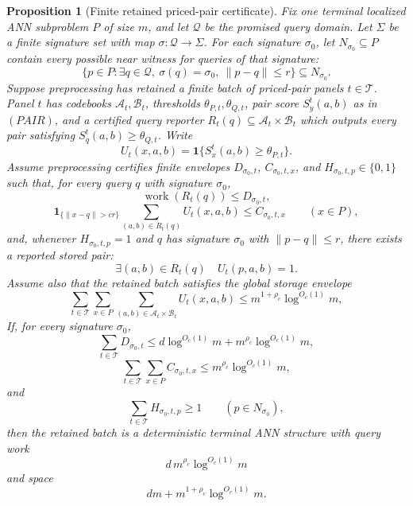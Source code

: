 \documentclass[10pt]{article}
\newtheorem{proposition}[theorem]{Proposition}
\theoremstyle{definition}
\begin{document}
\begin{proposition}[Finite retained priced-pair certificate]
   \label{prop:finite-retained-priced-pair}
   Fix one terminal localized ANN subproblem \(P\) of size \(m\), and let
   \(\mathcal Q\) be the promised query domain.  Let
   \(\Sigma\) be a finite signature set with map
   \(\sigma:\mathcal Q\to\Sigma\).  For each signature \(\sigma_0\), let
   \(N_{\sigma_0}\subseteq P\) contain every possible near witness for queries
   of that signature:
   \[
      \{p\in P:\exists q\in\mathcal Q,\ \sigma(q)=\sigma_0,\ \|p-q\|\le r\}
      \subseteq N_{\sigma_0}.
      \tag{FRP0}
   \]
   Suppose preprocessing has retained a finite batch of priced-pair panels
   \(t\in\mathcal T\).  Panel \(t\) has codebooks
   \(\mathcal A_t,\mathcal B_t\), thresholds
   \(\theta_{P,t},\theta_{Q,t}\), pair score \(S_y^t(a,b)\) as in
   \((PAIR)\), and a certified query reporter \(R_t(q)\subseteq
   \mathcal A_t\times\mathcal B_t\) which outputs every pair satisfying
   \(S_q^t(a,b)\ge\theta_{Q,t}\).  Write
   \[
      U_t(x,a,b)=\mathbf 1\{S_x^t(a,b)\ge\theta_{P,t}\}.
   \]
   Assume preprocessing certifies finite envelopes \(D_{\sigma_0,t}\),
   \(C_{\sigma_0,t,x}\), and \(H_{\sigma_0,t,p}\in\{0,1\}\) such that, for
   every query \(q\) with signature \(\sigma_0\),
   \[
      \operatorname{work}(R_t(q))\le D_{\sigma_0,t},
      \tag{FRP1}
   \]
   \[
      \mathbf 1_{\{\|x-q\|>cr\}}
      \sum_{(a,b)\in R_t(q)}U_t(x,a,b)
      \le C_{\sigma_0,t,x}
      \qquad(x\in P),
      \tag{FRP2}
   \]
   and, whenever \(H_{\sigma_0,t,p}=1\) and
   \(q\) has signature \(\sigma_0\) with \(\|p-q\|\le r\), there exists a
   reported stored pair:
   \[
      \exists(a,b)\in R_t(q)\quad U_t(p,a,b)=1.
      \tag{FRP3}
   \]
   Assume also that the retained batch satisfies the global storage envelope
   \[
      \sum_{t\in\mathcal T}\sum_{x\in P}
      \sum_{(a,b)\in\mathcal A_t\times\mathcal B_t}U_t(x,a,b)
      \le m^{1+\rho_c}\log^{O_c(1)}m,
      \tag{FRP5}
   \]
   If, for every signature \(\sigma_0\),
   \[
      \sum_{t\in\mathcal T}D_{\sigma_0,t}
      \le d\log^{O_c(1)}m+m^{\rho_c}\log^{O_c(1)}m,
      \tag{FRP4}
   \]
   \[
      \sum_{t\in\mathcal T}\sum_{x\in P}C_{\sigma_0,t,x}
      \le m^{\rho_c}\log^{O_c(1)}m,
      \tag{FRP6}
   \]
   and
   \[
      \sum_{t\in\mathcal T}H_{\sigma_0,t,p}\ge1
      \qquad(p\in N_{\sigma_0}),
      \tag{FRP7}
   \]
   then the retained batch is a deterministic terminal ANN structure with
   query work
   \[
      d\,m^{\rho_c}\log^{O_c(1)}m
   \]
   and space
   \[
      dm+m^{1+\rho_c}\log^{O_c(1)}m .
   \]
\end{proposition}
\end{document}
